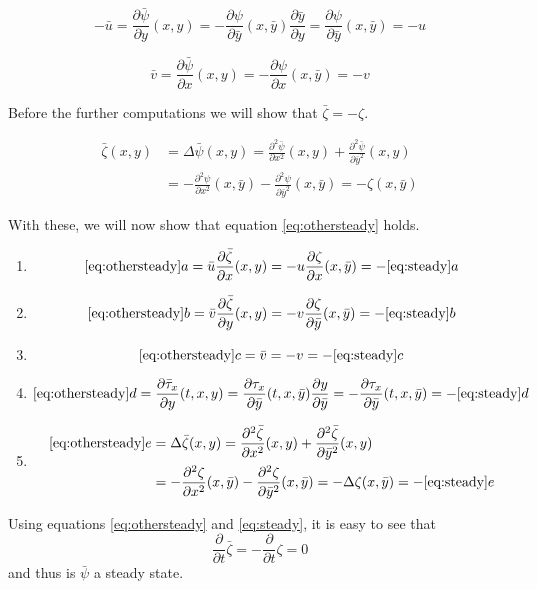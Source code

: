 \begin{equation*}
-\bar u=\frac{\partial \bar{\psi}}{\partial y}(x,y)=-\frac{\partial \psi}{\partial \bar y}(x,\bar y)\frac{\partial \bar{y}}{\partial y}=\frac{\partial \psi}{\partial \bar y}(x,\bar y)=-u
\end{equation*}

\begin{equation*}
\bar v=\frac{\partial \bar{\psi}}{\partial x}(x,y)=-\frac{\partial \psi}{\partial x}(x,\bar y)=-v
\end{equation*}

Before the further computations we will show that $\bar{\zeta}=-\zeta$.

\begin{align*}
\bar{\zeta}(x,y) &= \Delta \bar{\psi}(x,y)
=\frac{\partial^2\bar{\psi}}{\partial x^2}(x, y)+\frac{\partial^2\bar{\psi}}{\partial \bar y^2}(x, y)  \\
&=-\frac{\partial^2\psi}{\partial x^2}(x,\bar y)-\frac{\partial^2\psi}{\partial \bar y^2}(x,\bar y)
=-\zeta(x,\bar y)
\end{align*}

With these, we will now show that equation \ref{eq:othersteady} holds.

\begin{enumerate}[label=\alph*]
\item 
\begin{equation*}
\ref{eq:othersteady} a=\bar u\frac{\partial\bar{\zeta}}{\partial x} (x,y) =-u \frac{\partial\zeta}{\partial x} (x,\bar y)=-\ref{eq:steady}a
\end{equation*}
\item
\begin{equation}
\ref{eq:othersteady}b=\bar{v}\frac{\partial\bar{\zeta}}{\partial y} (x,y) =-v \frac{\partial\zeta}{\partial \bar y} (x,\bar y)=-\ref{eq:steady}b
\end{equation}
\item
$$\ref{eq:othersteady}c=\bar{v}=-v=-\ref{eq:steady}c$$
\item
$$\ref{eq:othersteady}d=\frac{\partial \bar \tau_x}{\partial y}(t,x,y)=\frac{\partial \tau_x}{\partial \bar y}(t,x,\bar y)\frac{\partial y}{\partial \bar y}=-\frac{\partial \tau_x}{\partial \bar y}(t,x,\bar y)=-\ref{eq:steady}d$$
\item
\begin{align*}
\ref{eq:othersteady}e& =\Delta \bar{\zeta}(x,y)
=\frac{\partial^2\bar{\zeta}}{\partial x^2}(x, y)+\frac{\partial^2\bar{\zeta}}{\partial \bar y^2}(x, y) \\
&=-\frac{\partial^2\zeta}{\partial x^2}(x,\bar y)-\frac{\partial^2\zeta}{\partial \bar y^2}(x,\bar y)=-\Delta\zeta(x,\bar y)=-\ref{eq:steady} e
\end{align*}
\end{enumerate}

Using equations \ref{eq:othersteady} and \ref{eq:steady}, it is easy to see that
$$\frac{\partial}{\partial t}\bar{\zeta}=-\frac{\partial}{\partial t}\zeta=0$$ and thus is $\bar{\psi}$ a steady state.



